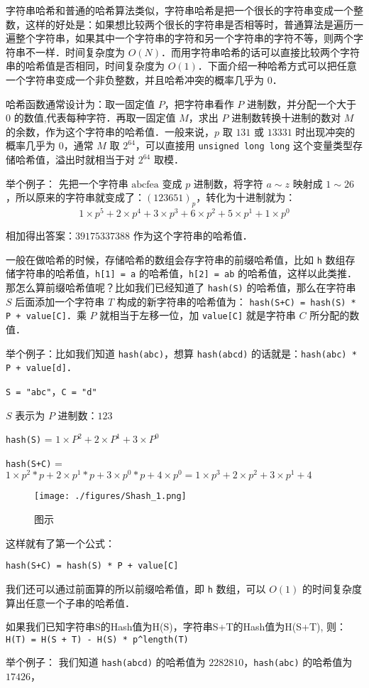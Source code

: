
字符串哈希和普通的哈希算法类似，字符串哈希是把一个很长的字符串变成一个整数，这样的好处是：如果想比较两个很长的字符串是否相等时，普通算法是遍历一遍整个字符串，如果其中一个字符串的字符和另一个字符串的字符不等，则两个字符串不一样．时间复杂度为 $O(N)$．而用字符串哈希的话可以直接比较两个字符串的哈希值是否相同，时间复杂度为 $O(1)$．下面介绍一种哈希方式可以把任意一个字符串变成一个非负整数，并且哈希冲突的概率几乎为 $0$．

哈希函数通常设计为：取一固定值 $P$，把字符串看作 $P$ 进制数，并分配一个大于 $0$ 的数值,代表每种字符．再取一固定值 $M$，求出 $P$ 进制数转换十进制的数对 $M$ 的余数，作为这个字符串的哈希值．一般来说，$p$ 取 $131$ 或 $13331$ 时出现冲突的概率几乎为 $0$，通常 $M$ 取 $2^{64}$，可以直接用 \verb|unsigned long long| 这个变量类型存储哈希值，溢出时就相当于对 $2^{64}$ 取模．

举个例子：
先把一个字符串 $\text{abcfea}$ 变成 $p$ 进制数，将字符 $a \sim z$ 映射成 $1 \sim 26$，所以原来的字符串就变成了：$(123651)_p$，转化为十进制就为：\begin{equation}
1 \times p^5 + 2 \times p^4 + 3 \times p^3 + 6 \times p^2 + 5 \times p^1 + 1 \times p^0
\end{equation}

相加得出答案：$39175337388$ 作为这个字符串的哈希值．

一般在做哈希的时候，存储哈希的数组会存字符串的前缀哈希值，比如 \verb|h| 数组存储字符串的哈希值，\verb|h[1] = a| 的哈希值，\verb|h[2] = ab| 的哈希值，这样以此类推．那怎么算前缀哈希值呢？比如我们已经知道了 \verb|hash(S)| 的哈希值，那么在字符串 $S$ 后面添加一个字符串 $T$ 构成的新字符串的哈希值为： \verb|hash(S+C) = hash(S) * P + value[C]|．乘 $P$ 就相当于左移一位，加 \verb|value[C]| 就是字符串 $C$ 所分配的数值．

举个例子：比如我们知道 \verb|hash(abc)|，想算 \verb|hash(abcd)| 的话就是：\verb|hash(abc) * P + value[d]|．

\verb|S = "abc"|，\verb|C = "d"|

$S$ 表示为 $P$ 进制数：$123$

\verb|hash(S)| = $1 \times P^2 + 2 \times P^1 + 3 \times P^0$

\verb|hash(S+C)| = $1 \times p^2 *p + 2 \times p^1*p + 3 \times p^0*p + 4 \times p^0 = 1 \times p^3 + 2 \times p ^ 2 + 3 \times p^1 + 4$

\begin{figure}[ht]
\centering
\texttt{[image: ./figures/Shash\_1.png]}
\caption{图示} \label{Shash_fig1}
\end{figure}

这样就有了第一个公式：

\verb|hash(S+C) = hash(S) * P + value[C]|

我们还可以通过前面算的所以前缀哈希值，即 \verb|h| 数组，可以 $O(1)$ 的时间复杂度算出任意一个子串的哈希值．

如果我们已知字符串S的Hash值为H(S)，字符串S+T的Hash值为H(S+T),
则：\verb|H(T) = H(S + T) - H(S) * p^length(T)|

举个例子：
我们知道 \verb|hash(abcd)| 的哈希值为 $2282810$，\verb|hash(abc)| 的哈希值为 $17426$， 
